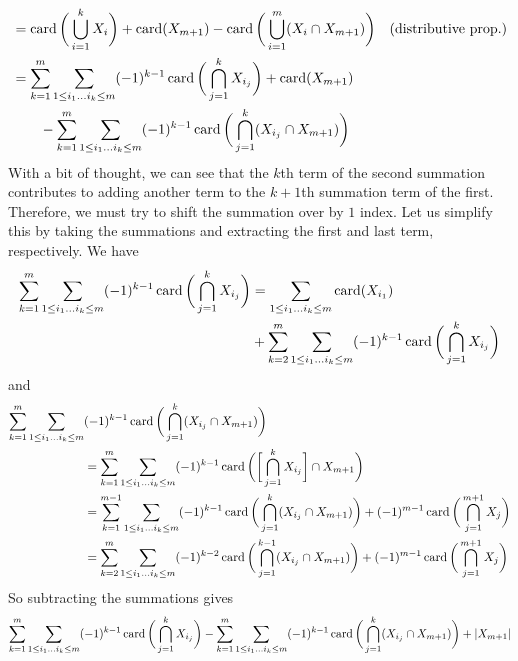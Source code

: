 \begin{solution}
\begin{align*}
      & = \operatorname*{card} \bigg( \bigcup_{i=1}^k X_i \bigg) + \operatorname*{card}(X_{m+1}) - \operatorname*{card}\bigg(\bigcup_{i=1}^m (X_i \cap X_{m+1}) \bigg) & (\text{distributive prop.})  \\
      & = \sum_{k=1}^m \sum_{1 \leq i_1 \ldots i_k \leq m} (-1)^{k-1} \operatorname*{card}\bigg( \bigcap_{j=1}^k X_{i_j} \bigg) + \operatorname*{card}(X_{m+1}) \\ 
      & \qquad - \sum_{k=1}^m \sum_{1 \leq i_1 \ldots i_k \leq m} (-1)^{k-1} \operatorname*{card}\bigg( \bigcap_{j=1}^k (X_{i_j} \cap X_{m+1}) \bigg) 
    \end{align*}
    With a bit of thought, we can see that the $k$th term of the second summation contributes to adding another term to the $k+1$th summation term of the first. Therefore, we must try to shift the summation over by $1$ index. Let us simplify this by taking the summations and extracting the first and last term, respectively. We have 
    \begin{align*}
    \sum_{k=1}^m \sum_{1 \leq i_1 \ldots i_k \leq m} (-1)^{k-1} \operatorname*{card}\bigg( \bigcap_{j=1}^k X_{i_j} \bigg) &= \sum_{1 \leq i_1 \ldots i_k \leq m} \operatorname*{card}(X_{i_1}) \\
    &+ \sum_{k=2}^m \sum_{1 \leq i_1 \ldots i_k \leq m} (-1)^{k-1} \operatorname*{card}\bigg( \bigcap_{j=1}^k X_{i_j} \bigg)
    \end{align*}
    and 
    \begin{align*}
      \sum_{k=1}^m \sum_{1 \leq i_1 \ldots i_k \leq m} & (-1)^{k-1} \operatorname*{card}\bigg( \bigcap_{j=1}^k (X_{i_j} \cap X_{m+1}) \bigg) \\
      & = \sum_{k=1}^m \sum_{1 \leq i_1 \ldots i_k \leq m} (-1)^{k-1} \operatorname*{card}\bigg( \bigg[ \bigcap_{j=1}^k X_{i_j} \bigg] \cap X_{m+1} \bigg) \\
      & =  \sum_{k=1}^{m-1} \sum_{1 \leq i_1 \ldots i_k \leq m} (-1)^{k-1} \operatorname*{card}\bigg( \bigcap_{j=1}^k (X_{i_j} \cap X_{m+1}) \bigg) + (-1)^{m-1} \operatorname*{card}\bigg( \bigcap_{j=1}^{m+1} X_j \bigg) \\
      & = \sum_{k=2}^{m} \sum_{1 \leq i_1 \ldots i_k \leq m} (-1)^{k-2} \operatorname*{card}\bigg( \bigcap_{j=1}^{k-1} (X_{i_j} \cap X_{m+1}) \bigg) + (-1)^{m-1} \operatorname*{card}\bigg( \bigcap_{j=1}^{m+1} X_j \bigg)
    \end{align*}
    So subtracting the summations gives 
    \begin{align*}
      \sum_{k=1}^m & \sum_{1 \leq i_1 \ldots i_k \leq m} (-1)^{k-1} \card\bigg( \bigcap_{j=1}^k X_{i_j} \bigg) - \sum_{k=1}^m \sum_{1 \leq i_1 \ldots i_k \leq m} (-1)^{k-1} \card\bigg( \bigcap_{j=1}^k (X_{i_j} \cap X_{m+1}) \bigg) + |X_{m+1}| \\

\end{align*}
\end{solution}
